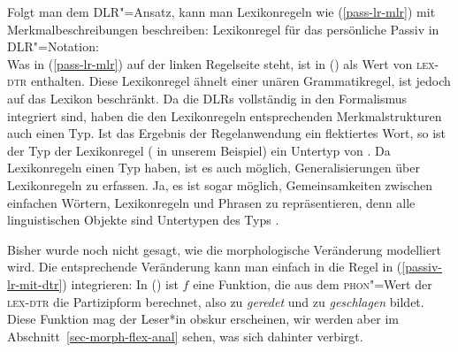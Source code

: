 Folgt man dem DLR"=Ansatz, kann man Lexikonregeln wie (\ref{pass-lr-mlr}) mit Merkmalbeschreibungen
beschreiben:\label{pageref-lr-mit-dtr}
\ea
\label{passiv-lr-mit-dtr}%
Lexikonregel für das persönliche Passiv in DLR"=Notation:\\
\z
Was in (\ref{pass-lr-mlr}) auf der linken Regelseite steht, ist in () als
Wert von \textsc{lex-dtr} enthalten. Diese Lexikonregel ähnelt einer unären Grammatikregel,
ist jedoch auf das Lexikon beschränkt. Da die DLRs vollständig in den Formalismus integriert
sind, haben die den Lexikonregeln entsprechenden Merkmalstrukturen auch einen Typ. Ist das Ergebnis der
Regelanwendung ein flektiertes Wort, so ist der Typ der Lexikonregel ( in unserem Beispiel)
ein Untertyp von . Da Lexikonregeln einen Typ haben, ist es auch möglich, Generalisierungen über Lexikonregeln
zu erfassen. Ja, es ist sogar möglich, Gemeinsamkeiten zwischen einfachen Wörtern, Lexikonregeln und
Phrasen zu repräsentieren, denn alle linguistischen Objekte sind Untertypen des Typs .

Bisher wurde noch nicht gesagt, wie die morphologische Veränderung modelliert wird.
Die entsprechende Veränderung kann man einfach in die Regel in (\ref{passiv-lr-mit-dtr}) integrieren:
\ea
\label{passive-lr-mit-phon}
\z
In () ist $f$ eine Funktion, die aus dem \textsc{phon}"=Wert der \textsc{lex-dtr} die Partizipform berechnet,
also zu  \emph{geredet} und zu  \emph{geschlagen} bildet.
Diese Funktion mag der Leser*in obskur erscheinen, wir werden aber im Abschnitt~\ref{sec-morph-flex-anal}
sehen, was sich dahinter verbirgt.

